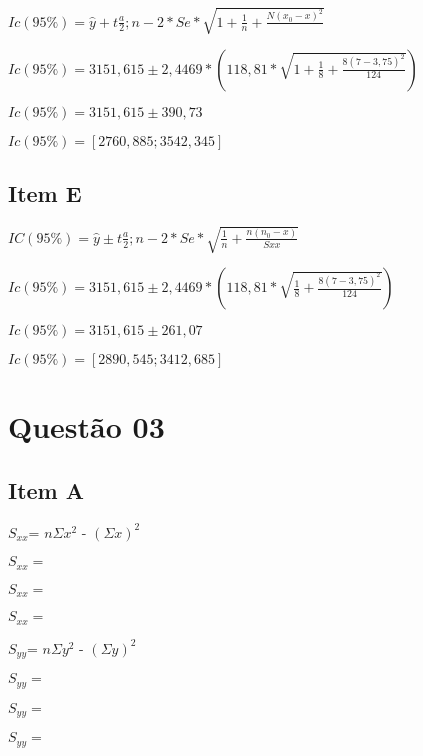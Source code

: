 \documentclass{article}
\begin{document}
            \begin{flushleft}
            $Ic(95\%) = \hat{y} + t\frac{a}{2};n-2 *Se* \sqrt{1 + \frac{1}{n} +\frac{N(x_0 -x)^2}{}}$

            $Ic(95\%) = 3151,615 \pm 2,4469 *  (118,81* \sqrt{1 + \frac{1}{8} + \frac{8(7-3,75)^2}{124}})$

            $Ic(95\%) =  3151,615 \pm 390,73$

            $Ic(95\%) = [2760,885 ; 3542,345]$
    \end{flushleft}


    \subsection{Item E}

            \begin{flushleft}
            $IC(95\%) = \hat{y} \pm  t \frac{a}{2}; n-2 *Se * \sqrt{\frac{1}{n} + \frac{n(n_0 - x)}{Sxx}}$ 

            $Ic(95\%) = 3151,615 \pm 2,4469 *  (118,81* \sqrt{\frac{1}{8} + \frac{8(7-3,75)^2}{124}})$

            $Ic(95\%) =  3151,615 \pm 261,07$

            $Ic(95\%) = [2890,545 ; 3412,685]$

            \end{flushleft}


\section{Questão 03}    

    \subsection*{Item A}
        
        \begin{flushleft}

        $S_{xx}$= $n\Sigma x^2$ - $(\Sigma x)^2$ 

        $S_{xx} =$

        $S_{xx} =$

        $S_{xx}=$

        \end{flushleft}

        \begin{flushleft}
            $S_{yy}$= $n\Sigma y^2$ - $(\Sigma y)^2$

            $S_{yy} = $

            $S_{yy} = $

            $S_{yy} = $

        \end{flushleft}
\end{document}
